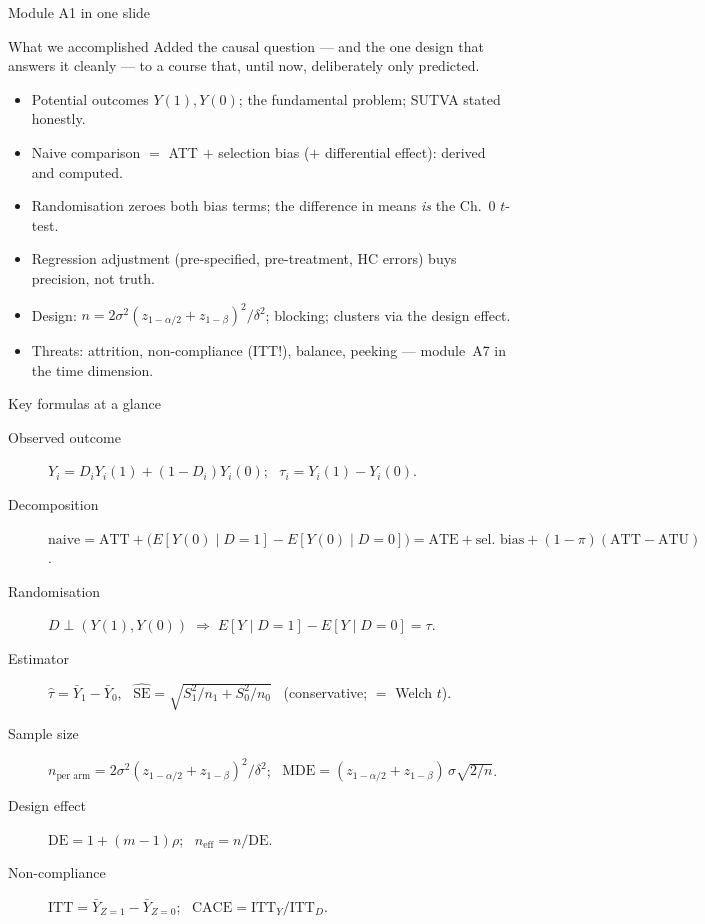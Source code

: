 \documentclass[aspectratio=169,11pt]{beamer}
\begin{document}
\begin{frame}{Module A1 in one slide}
  \begin{block}{What we accomplished}
    Added the causal question --- and the one design that answers it cleanly --- to a
    course that, until now, deliberately only predicted.
  \end{block}
  \begin{itemize}
    \item Potential outcomes $Y(1), Y(0)$; the fundamental problem; SUTVA stated honestly.
    \item Naive comparison $=$ ATT $+$ selection bias ($+$ differential effect):
          derived and computed.
    \item Randomisation zeroes both bias terms; the difference in means \emph{is} the
          Ch.~0 $t$-test.
    \item Regression adjustment (pre-specified, pre-treatment, HC errors) buys precision,
          not truth.
    \item Design: $n = 2\sigma^2(z_{1-\alpha/2}+z_{1-\beta})^2/\delta^2$; blocking;
          clusters via the design effect.
    \item Threats: attrition, non-compliance (ITT!), balance, peeking --- module~A7 in the
          time dimension.
  \end{itemize}
\end{frame}

\begin{frame}{Key formulas at a glance}
  \footnotesize
  \begin{description}
    \item[Observed outcome] $Y_i = D_iY_i(1) + (1-D_i)Y_i(0)$; \ $\tau_i = Y_i(1)-Y_i(0)$.
    \item[Decomposition] $\text{naive} = \text{ATT} + \big(E[Y(0)\mid D{=}1]-E[Y(0)\mid D{=}0]\big)
          = \text{ATE} + \text{sel.\ bias} + (1-\pi)(\text{ATT}-\text{ATU})$.
    \item[Randomisation] $D\perp(Y(1),Y(0)) \;\Rightarrow\; E[Y\mid D{=}1]-E[Y\mid D{=}0]=\tau$.
    \item[Estimator] $\hat\tau = \bar Y_1 - \bar Y_0$, \
          $\widehat{\mathrm{SE}} = \sqrt{S_1^2/n_1 + S_0^2/n_0}$ \ (conservative; $=$ Welch $t$).
    \item[Sample size] $n_{\text{per arm}} = 2\sigma^2(z_{1-\alpha/2}+z_{1-\beta})^2/\delta^2$; \
          $\mathrm{MDE} = (z_{1-\alpha/2}+z_{1-\beta})\,\sigma\sqrt{2/n}$.
    \item[Design effect] $\mathrm{DE} = 1+(m-1)\rho$; \ $n_{\text{eff}} = n/\mathrm{DE}$.
    \item[Non-compliance] $\mathrm{ITT} = \bar Y_{Z=1}-\bar Y_{Z=0}$; \
          $\mathrm{CACE} = \mathrm{ITT}_Y / \mathrm{ITT}_D$.
  \end{description}
\end{frame}
\end{document}
